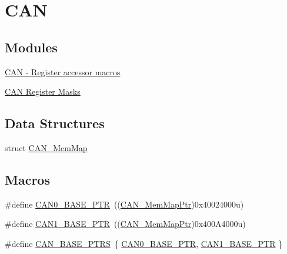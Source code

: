 \hypertarget{group___c_a_n___peripheral}{}\section{C\+A\+N}
\label{group___c_a_n___peripheral}
\subsection*{Modules}
\begin{DoxyCompactItemize}
\item 
\hyperlink{group___c_a_n___register___accessor___macros}{C\+A\+N -\/ Register accessor macros}
\item 
\hyperlink{group___c_a_n___register___masks}{C\+A\+N Register Masks}
\end{DoxyCompactItemize}
\subsection*{Data Structures}
\begin{DoxyCompactItemize}
\item 
struct \hyperlink{struct_c_a_n___mem_map}{C\+A\+N\+\_\+\+Mem\+Map}
\end{DoxyCompactItemize}
\subsection*{Macros}
\begin{DoxyCompactItemize}
\item 
\#define \hyperlink{group___c_a_n___peripheral_ga1ee8f499e10af9b8e3132e0168e519b9}{C\+A\+N0\+\_\+\+B\+A\+S\+E\+\_\+\+P\+T\+R}~((\hyperlink{group___c_a_n___peripheral_gadc219505f1f3c5212d1e670b3d57d9b6}{C\+A\+N\+\_\+\+Mem\+Map\+Ptr})0x40024000u)
\item 
\#define \hyperlink{group___c_a_n___peripheral_ga810387eeeb9ccd0e09ae057ff6f0d2ca}{C\+A\+N1\+\_\+\+B\+A\+S\+E\+\_\+\+P\+T\+R}~((\hyperlink{group___c_a_n___peripheral_gadc219505f1f3c5212d1e670b3d57d9b6}{C\+A\+N\+\_\+\+Mem\+Map\+Ptr})0x400\+A4000u)
\item 
\#define \hyperlink{group___c_a_n___peripheral_gaf9ce8b815aacb2022a8a7454f4028a6c}{C\+A\+N\+\_\+\+B\+A\+S\+E\+\_\+\+P\+T\+R\+S}~\{ \hyperlink{group___c_a_n___peripheral_ga1ee8f499e10af9b8e3132e0168e519b9}{C\+A\+N0\+\_\+\+B\+A\+S\+E\+\_\+\+P\+T\+R}, \hyperlink{group___c_a_n___peripheral_ga810387eeeb9ccd0e09ae057ff6f0d2ca}{C\+A\+N1\+\_\+\+B\+A\+S\+E\+\_\+\+P\+T\+R} \}
\end{DoxyCompactItemize}

